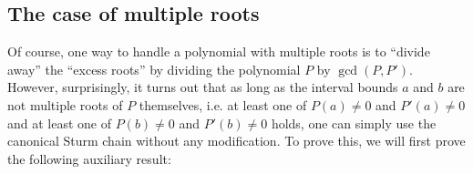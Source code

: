 \documentclass[11pt,a4paper,oneside]{article}
\newcommand{\RR}{\mathbb{R}}
\newcommand{\ie}{i.\,e.\xspace}
\begin{document}



\subsection{The case of multiple roots}

Of course, one way to handle a polynomial with multiple roots is to \enquote{divide away} the \enquote{excess roots} by dividing the polynomial $P$ by $\gcd(P,P')$. However, surprisingly, it turns out that as long as the interval bounds $a$ and $b$ are not multiple roots of $P$ themselves, i.e. at least one of $P(a)\neq 0$ and $P'(a)\neq 0$ and at least one of $P(b)\neq 0$ and $P'(b)\neq 0$ holds, one can simply use the canonical Sturm chain without any modification. To prove this, we will first prove the following auxiliary result:


\end{document}
